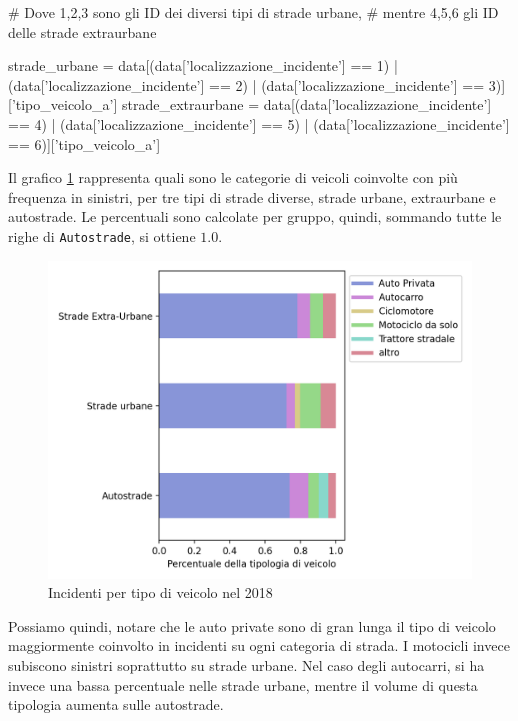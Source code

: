 \documentclass[a4paper,12pt]{report}
\newcommand{\columnstyle}[1]{\texttt{#1}}
\begin{document}
\begin{code}[language=Python]
# Dove 1,2,3 sono gli ID dei diversi tipi di strade urbane, 
# mentre 4,5,6 gli ID delle strade extraurbane

strade_urbane = data[(data['localizzazione_incidente'] == 1) | (data['localizzazione_incidente'] == 2) | (data['localizzazione_incidente'] == 3)]['tipo_veicolo_a']
strade_extraurbane = data[(data['localizzazione_incidente'] == 4) | (data['localizzazione_incidente'] == 5) | (data['localizzazione_incidente'] == 6)]['tipo_veicolo_a']
\end{code}

Il grafico \ref{fig:differenza-strade} rappresenta quali sono le categorie di veicoli 
coinvolte con più frequenza in sinistri, per tre tipi di strade diverse, strade urbane, 
extraurbane e autostrade. 
Le percentuali sono calcolate per gruppo, quindi, sommando 
tutte le righe di \columnstyle{Autostrade}, si ottiene $1.0$. 

\begin{figure}
    \includegraphics[width=\linewidth]{../src/incidenti/incidenti_senza_coords/tipo_veicoli/differenza_strade.png}
    \caption{Incidenti per tipo di veicolo nel 2018}
    \label{fig:differenza-strade}
\end{figure}

Possiamo quindi, notare che le auto private sono di gran lunga il tipo di veicolo 
maggiormente coinvolto in incidenti su ogni categoria di strada. 
I motocicli invece subiscono sinistri soprattutto su strade urbane.
Nel caso degli autocarri, si ha invece una bassa percentuale nelle strade 
urbane, mentre il volume di questa tipologia aumenta sulle autostrade. 
\end{document}

